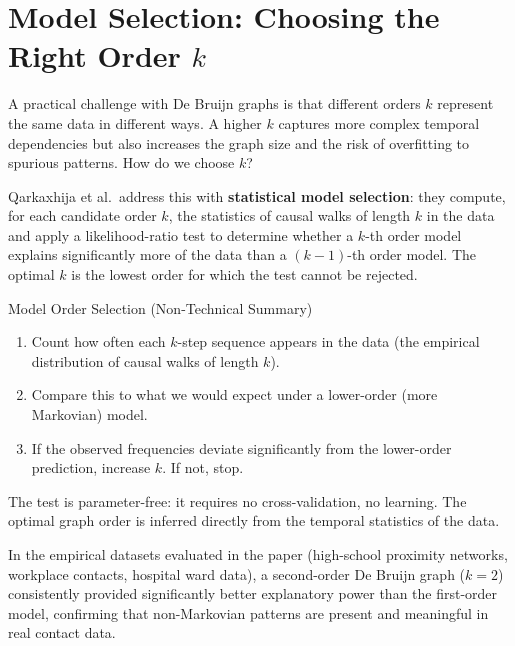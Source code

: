 \section{Model Selection: Choosing the Right Order $k$}

A practical challenge with De Bruijn graphs is that different orders $k$ represent the same
data in different ways. A higher $k$ captures more complex temporal dependencies but also
increases the graph size and the risk of overfitting to spurious patterns. How do we choose $k$?

Qarkaxhija et al.\ address this with \textbf{statistical model selection}: they compute, for
each candidate order $k$, the statistics of causal walks of length $k$ in the data and apply
a likelihood-ratio test to determine whether a $k$-th order model explains significantly more
of the data than a $(k-1)$-th order model. The optimal $k$ is the lowest order for which the
test cannot be rejected.

\begin{conceptbox}{Model Order Selection (Non-Technical Summary)}
\begin{enumerate}[noitemsep]
    \item Count how often each $k$-step sequence appears in the data (the empirical distribution
          of causal walks of length $k$).
    \item Compare this to what we would expect under a lower-order (more Markovian) model.
    \item If the observed frequencies deviate significantly from the lower-order prediction,
          increase $k$. If not, stop.
\end{enumerate}
The test is parameter-free: it requires no cross-validation, no learning. The optimal graph
order is inferred directly from the temporal statistics of the data.
\end{conceptbox}

In the empirical datasets evaluated in the paper (high-school proximity networks, workplace
contacts, hospital ward data), a second-order De Bruijn graph ($k=2$) consistently provided
significantly better explanatory power than the first-order model, confirming that non-Markovian
patterns are present and meaningful in real contact data.

